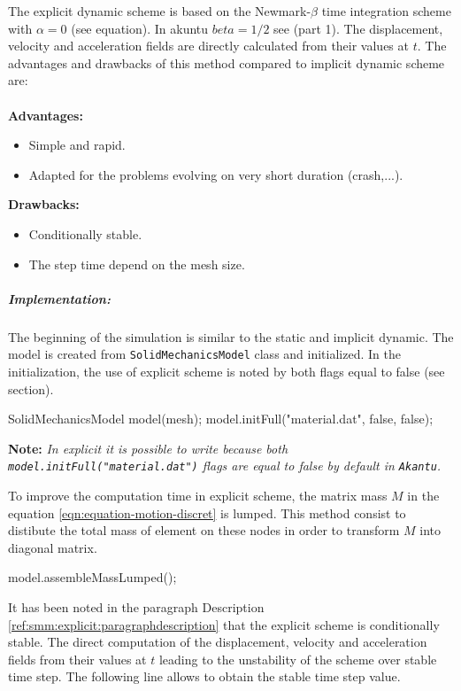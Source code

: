 \documentclass[a4paper,11pt]{book}
\newcommand{\code}[1]{{\tt{#1}}}
\newcommand{\note}[1]{\textbf{Note: }\textit{#1}}
\begin{document}
The explicit dynamic scheme is based on the Newmark-$\beta$ time integration 
scheme with $\alpha=0$ (see equation). In akuntu $beta=1/2$ see (part 1). The 
displacement, velocity and acceleration fields are directly calculated from 
their values at $t$. The advantages and drawbacks of this method compared to 
implicit dynamic scheme are:
\\
\\
\textbf{Advantages:}
\begin{itemize}
\item Simple and rapid.
\item Adapted for the problems evolving on very short duration (crash,...).
\end{itemize}
\textbf{Drawbacks:}
\begin{itemize}
\item Conditionally stable.
\item The step time depend on the mesh size.
\end{itemize}

\subparagraph{Implementation:}

The beginning of the simulation is similar to the static and implicit dynamic. 
The model is created from \code{SolidMechanicsModel} class and initialized. 
In the initialization, the use of explicit scheme is noted by both flags equal
 to false (see section). 

\begin{cpp}
  SolidMechanicsModel model(mesh);
  model.initFull("material.dat", false, false);
\end{cpp}

\note{In explicit it is possible to write because both  
 \code{model.initFull("material.dat")}
 flags are equal to false by default in \code{Akantu}.}

To improve the computation time in explicit scheme, the matrix mass $M$ in 
the equation \ref{eqn:equation-motion-discret} is lumped. 
This method consist to distibute the total mass of element on these nodes 
in order to transform $M$ into diagonal matrix.

\begin{cpp}
  model.assembleMassLumped();
\end{cpp}

It has been noted in the paragraph Description 
\ref{ref:smm:explicit:paragraphdescription} that the explicit scheme is 
conditionally stable. 
The direct computation of the displacement, velocity and acceleration fields 
from their values at $t$ leading to the unstability of the scheme over stable 
time step. 
The following line allows to obtain the stable time step value.
\end{document}

